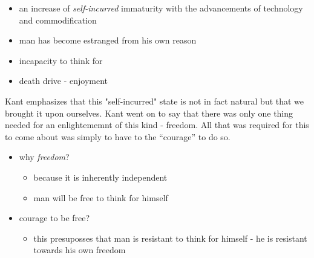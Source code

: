 \documentclass{article}
\begin{document}
\begin{itemize}
\item an increase of \textit{self-incurred} immaturity with the advancements of technology and commodification
\item man has become estranged from his own reason
\item incapacity to think for 
\item death drive - enjoyment
\end{itemize}

Kant emphasizes that this "self-incurred" state is not in fact natural but that we brought it upon ourselves. Kant went on to say that there was only one thing needed for an enlightememnt of this kind - freedom.
All that was required for this to come about was simply to have to the ``courage'' to do so.
\begin{itemize}
\item why  \textit{freedom}?
\begin{itemize}
  \item because it is inherently independent
  \item man will be free to think for himself
\end{itemize}
\item courage to be free?
\begin{itemize}
  \item this presuposses that man is resistant to think for himself - he is resistant towards his own freedom
\end{itemize}
\end{itemize}
\end{document}

